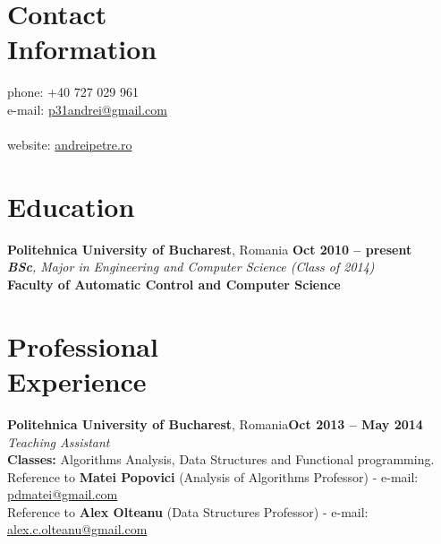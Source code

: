 \documentclass[margin,line]{resume}
\begin{document}
\begin{resume}

    \section{\mysidestyle Contact\\Information}

	phone: +40 727 029 961              \\
	e-mail:  \href{mailto:p31andrei@gmail.com}{p31andrei@gmail.com}  \vspace{0mm}\\\vspace{-4.5mm}\\%
	website: \href{http://andreipetre.ro}{andreipetre.ro}

    \section{\mysidestyle Education}

	\textbf{Politehnica University of Bucharest}, Romania \hfill \textbf{ Oct 2010 -- present}\vspace{1.2mm}\\%
	\textsl{\textbf{BSc}, Major in Engineering and Computer Science (Class of 2014)}\vspace{1.5mm}\\
	\small{\textbf{Faculty of Automatic Control and Computer Science}}

    \section{\mysidestyle Professional\\Experience}

	\vspace{1.2mm}\textbf{Politehnica University of Bucharest}, Romania\hfill \textbf{Oct 2013 -- May 2014}\vspace{1.2mm}\\
	\vspace{1mm} \textsl{Teaching Assistant}\vspace{1.5mm}\\
	\textbf{Classes:} Algorithms Analysis, Data Structures and Functional programming.\vspace{1.5mm}\\
	\small{Reference to \textbf{Matei Popovici} (Analysis of Algorithms Professor) - e-mail: \href{mailto:pdmatei@gmail.com}{pdmatei@gmail.com}}\\
	\small{Reference to \textbf{Alex Olteanu} (Data Structures Professor) - e-mail: \href{mailto:alex.c.olteanu@gmail.com}{alex.c.olteanu@gmail.com}}


\end{resume}
\end{document}

